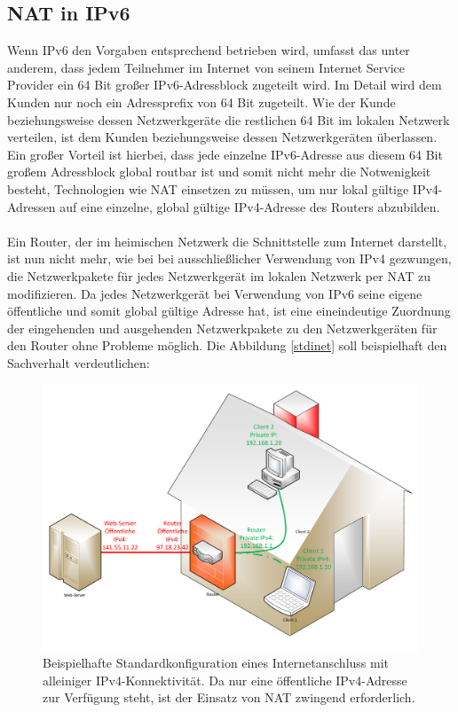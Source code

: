 \documentclass[a4paper,12pt]{scrartcl}
\begin{document}
\subsection{NAT in IPv6}
Wenn IPv6 den Vorgaben entsprechend betrieben wird, umfasst das unter anderem, dass jedem Teilnehmer im Internet von seinem Internet Service Provider ein 64 Bit gro{\ss}er  IPv6-Adressblock zugeteilt wird. Im Detail wird dem Kunden nur noch ein Adressprefix von 64 Bit zugeteilt. Wie der Kunde beziehungsweise dessen Netzwerkger\"ate die restlichen 64 Bit im lokalen Netzwerk verteilen, ist dem Kunden beziehungsweise dessen Netzwerkger\"aten  \"uberlassen. Ein gro{\ss}er Vorteil ist hierbei, dass jede einzelne IPv6-Adresse aus diesem 64 Bit gro{\ss}em Adressblock global routbar ist und somit nicht mehr die Notwenigkeit besteht, Technologien wie NAT einsetzen zu m\"ussen, um nur lokal g\"ultige IPv4-Adressen auf eine einzelne, global g\"ultige IPv4-Adresse des Routers abzubilden.\\
\\
Ein Router, der im heimischen Netzwerk die Schnittstelle zum Internet darstellt, ist nun nicht mehr, wie bei bei ausschließlicher Verwendung von IPv4 gezwungen, die Netzwerkpakete f\"ur jedes Netzwerkger\"at im lokalen Netzwerk per NAT zu modifizieren. Da jedes Netzwerkger\"at bei Verwendung von IPv6 seine eigene öffentliche und somit  global g\"ultige Adresse hat, ist eine eineindeutige Zuordnung der eingehenden und ausgehenden Netzwerkpakete zu den Netzwerkger\"aten f\"ur den Router ohne Probleme m\"oglich.  Die Abbildung \ref{stdinet} soll beispielhaft den Sachverhalt verdeutlichen:

\begin{figure}[htb]
\begin{center}
 \includegraphics[width=.9\hsize]{./Zeichnungen/IPv4NAT.pdf}
 \end{center}
\caption[Beispielhafte Standardkonfiguration eines Internetanschluss mit alleiniger IPv4-Konnektivität. Da nur eine öffentliche IPv4-Adresse zur Verfügung steht, ist der Einsatz von NAT zwingend erforderlich. Quelle: Autor, verwendete Symbole unterliegen der
GPL]{\label{stdinetv4}Beispielhafte Standardkonfiguration eines Internetanschluss mit alleiniger IPv4-Konnektivität. Da nur eine öffentliche IPv4-Adresse zur Verfügung steht, ist der Einsatz von NAT zwingend erforderlich.}
\end{figure}
\end{document}

